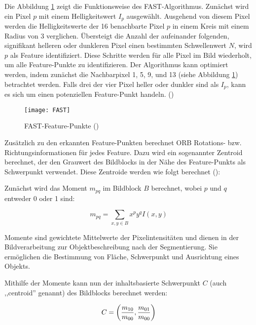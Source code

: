 Die Abbildung \ref{fig:FAST} zeigt die Funktionsweise des FAST-Algorithmus. Zunächst wird ein Pixel \( p \) mit einem Helligkeitswert \( I_p \) ausgewählt. Ausgehend von diesem Pixel werden die Helligkeitswerte der 16 benachbarte Pixel \( p \) in einem Kreis mit einem Radius von 3 verglichen. Übersteigt die Anzahl der aufeinander folgenden, signifikant helleren oder dunkleren Pixel einen bestimmten Schwellenwert \( N \), wird \( p \) als Feature identifiziert. Diese Schritte werden für alle Pixel im Bild wiederholt, um alle Feature-Punkte zu identifizieren. Der Algorithmus kann optimiert werden, indem zunächst die Nachbarpixel 1, 5, 9, und 13 (siehe Abbildung \ref{fig:FAST}) betrachtet werden. Falls drei der vier Pixel heller oder dunkler sind als \( I_p \), kann es sich um einen potenziellen Feature-Punkt handeln. (\cite{gao2021vSLAM, rosten2006fast})

\begin{figure}
    \centering
    \texttt{[image: FAST]}
    \caption{FAST-Feature-Punkte (\cite{rosten2006fast})\label{fig:FAST}}\par
\end{figure}

Zusätzlich zu den erkannten Feature-Punkten berechnet ORB Rotations- bzw. Richtungsinformationen für jedes Feature. Dazu wird ein sogenannter Zentroid berechnet, der den Grauwert des Bildblocks in der Nähe des Feature-Punkts als Schwerpunkt verwendet. Diese Zentroide werden wie folgt berechnet (\cite{gao2021vSLAM, rublee2011orb}):

Zunächst wird das Moment \( m_{pq} \) im Bildblock \( B \) berechnet, wobei \( p \) und \( q \) entweder 0 oder 1 sind:

\begin{equation}
    m_{pq} = \sum_{x,y \in B} x^p y^q I(x, y)
\end{equation}

\begin{tcolorbox}[colback=THAi-Blue!20!white, colframe=THAi-Blue]
    Momente sind gewichtete Mittelwerte der Pixelintensitäten und dienen in der Bildverarbeitung zur Objektbeschreibung nach der Segmentierung. Sie ermöglichen die Bestimmung von Fläche, Schwerpunkt und Ausrichtung eines Objekts.
\end{tcolorbox}

Mithilfe der Momente kann nun der inhaltsbasierte Schwerpunkt \( C \) (auch ,,centroid'' genannt) des Bildblocks berechnet werden:

\begin{equation}
C = 
\left(
\frac{m_{10}}{m_{00}}, \\
\frac{m_{01}}{m_{00}}
\right)
\end{equation}

